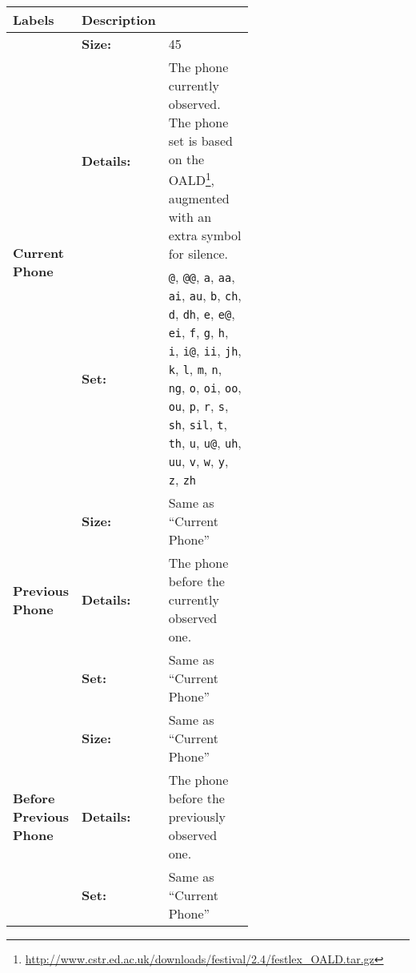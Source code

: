 \begin{longtable}[c]{llp{0.6\linewidth}}
\toprule

{\bf Labels } & {\bf Description }& {\bf   }\\
\midrule
\multirow{3}{0.18\linewidth}{{\bf Current Phone}}
          & {\bf Size:} 
                                & 45 \\
          & {\bf Details:} 
                                & The phone currently observed. The phone set is based on the \ac{OALD}\footnote{ \url{http://www.cstr.ed.ac.uk/downloads/festival/2.4/festlex_OALD.tar.gz}}, augmented with an extra symbol for silence.  \\
          & {\bf Set:} 
                                & \verb|@|, \verb|@@|, \verb|a|, \verb|aa|, \verb|ai|, \verb|au|, \verb|b|, \verb|ch|, \verb|d|, \verb|dh|, \verb|e|, \verb|e@|, \verb|ei|, \verb|f|, \verb|g|, \verb|h|, \verb|i|, \verb|i@|, \verb|ii|, \verb|jh|, \verb|k|, \verb|l|, \verb|m|, \verb|n|, \verb|ng|, \verb|o|, \verb|oi|, \verb|oo|, \verb|ou|, \verb|p|, \verb|r|, \verb|s|, \verb|sh|, \verb|sil|, \verb|t|, \verb|th|, \verb|u|, \verb|u@|, \verb|uh|, \verb|uu|, \verb|v|, \verb|w|, \verb|y|, \verb|z|, \verb|zh|\\ 
          \midrule
          
\multirow{3}{0.18\linewidth}{{\bf Previous Phone}}
          & {\bf Size:} 
                                & Same as ``Current Phone'' \\
          & {\bf Details:} 
                                & The phone before the currently observed one. \\
          & {\bf Set:} 
                                & Same as ``Current Phone'' \\
          \midrule

\multirow{3}{0.18\linewidth}{{\bf Before Previous Phone}}
          & {\bf Size:} 
                                & Same as ``Current Phone'' \\
          & {\bf Details:} 
                                & The phone before the previously observed one. \\
          & {\bf Set:} 
                                & Same as ``Current Phone'' \\
          \midrule


\end{longtable}
